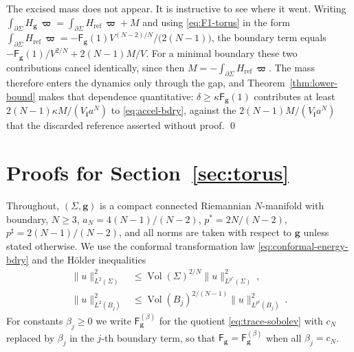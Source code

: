 \documentclass[aps,prd,reprint,amsmath,amssymb,nofootinbib,longbibliography]{revtex4-2}
\DeclareMathOperator{\Vol}{Vol}
\newcommand{\g}{\mathbf{g}}                 %
\newcommand{\bvol}{\boldsymbol{\varpi}}     %
\newcommand{\ini}[1]{{#1}_{\mathbf{i}}}     %
\newcommand{\Href}{H_{\mathrm{ref}}}
\newcommand{\pstar}{p^{*}}
\newcommand{\psharp}{p^{\sharp}}
\newcommand{\aN}{a_N}
\newcommand{\cN}{c_N}
\newcommand{\Fq}{\mathsf{F}}                %
\theoremstyle{plain}
\theoremstyle{definition}
\theoremstyle{remark}
\begin{document}
The excised mass does not appear. It is instructive to see where it went. Writing $\int_{\partial\Sigma}H_\g\,\bvol=\int_{\partial\Sigma}\Href\,\bvol+M$ and using \eqref{eq:F1-torus} in the form $\int_{\partial\Sigma}\Href\,\bvol=-\Fq_\g(1)V^{(N-2)/N}/\big(2(N-1)\big)$, the boundary term equals $-\Fq_\g(1)/V^{2/N}+2(N-1)M/V$. For a minimal boundary these two contributions cancel identically, since then $M=-\int_{\partial\Sigma}\Href\,\bvol$. The mass therefore enters the dynamics only through the gap, and Theorem~\ref{thm:lower-bound} makes that dependence quantitative: $\delta\ge\kappa\Fq_\g(1)$ contributes at least $2(N-1)\kappa M/(\ini V a^N)$ to \eqref{eq:accel-bdry}, against the $2(N-1)M/(\ini V a^N)$ that the discarded reference asserted without proof. \qed

\section{Proofs for Section~\ref{sec:torus}}
\label{app:proofs}

Throughout, $(\Sigma,\g)$ is a compact connected Riemannian $N$-manifold with boundary, $N\ge3$, $\aN=4(N-1)/(N-2)$, $\pstar=2N/(N-2)$, $\psharp=2(N-1)/(N-2)$, and all norms are taken with respect to $\g$ unless stated otherwise. We use the conformal transformation law \eqref{eq:conformal-energy-bdry} and the H\"older inequalities
\begin{align}
\|u\|^2_{L^2(\Sigma)}&\le\Vol(\Sigma)^{2/N}\|u\|^2_{L^{\pstar}(\Sigma)}\ ,\nonumber\\
\label{eq:hoelder}
\|u\|^2_{L^2(B_j)}&\le\Vol(B_j)^{2/(N-1)}\|u\|^2_{L^{\psharp}(B_j)}\ .
\end{align}
For constants $\beta_j\ge0$ we write $\Fq^{(\beta)}_\g$ for the quotient \eqref{eq:trace-sobolev} with $\cN$ replaced by $\beta_j$ in the $j$-th boundary term, so that $\Fq_\g=\Fq^{(\beta)}_\g$ when all $\beta_j=\cN$.
\end{document}
